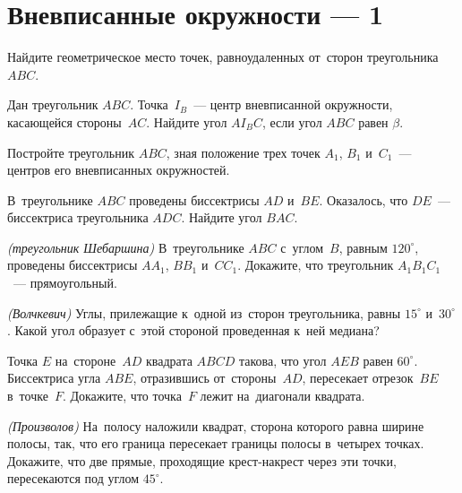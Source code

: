 
\section*{Вневписанные окружности --- 1}


\begin{problems}

\item
Найдите геометрическое место точек, равноудаленных от~сторон
треугольника $ABC$.

\item
Дан треугольник $ABC$.
Точка~$I_{B}$~--- центр вневписанной окружности, касающейся стороны~$AC$.
Найдите угол $A I_{B} C$, если угол $ABC$ равен $\beta$.

\item
Постройте треугольник $ABC$, зная положение трех точек $A_1$, $B_1$ и~$C_1$~---
центров его вневписанных окружностей.

\item
В~треугольнике $ABC$ проведены биссектрисы $AD$ и~$BE$.
Оказалось, что $DE$~--- биссектриса треугольника $ADC$.
Найдите угол $BAC$.

\item\emph{(треугольник Шебаршина)}
В~треугольнике $ABC$ с~углом~$B$, равным $120^{\circ}$\!, проведены биссектрисы
$A A_1$, $B B_1$ и~$C C_1$.
Докажите, что треугольник $A_1 B_1 C_1$~--- прямоугольный.

\item\emph{(Волчкевич)}
Углы, прилежащие к~одной из~сторон треугольника, равны $15^{\circ}$
и~$30^{\circ}$\!.
Какой угол образует с~этой стороной проведенная к~ней медиана?

\item
Точка $E$ на~стороне~$AD$ квадрата $ABCD$ такова, что угол $AEB$ равен
$60^{\circ}$.
Биссектриса угла $ABE$, отразившись от~стороны~$AD$, пересекает отрезок~$BE$
в~точке~$F$.
Докажите, что точка~$F$ лежит на~диагонали квадрата.

\item\emph{(Произволов)}
На~полосу наложили квадрат, сторона которого равна ширине полосы, так, что его
граница пересекает границы полосы в~четырех точках.
Докажите, что две прямые, проходящие крест-накрест через эти точки,
пересекаются под углом $45^{\circ}$.


\end{problems}

